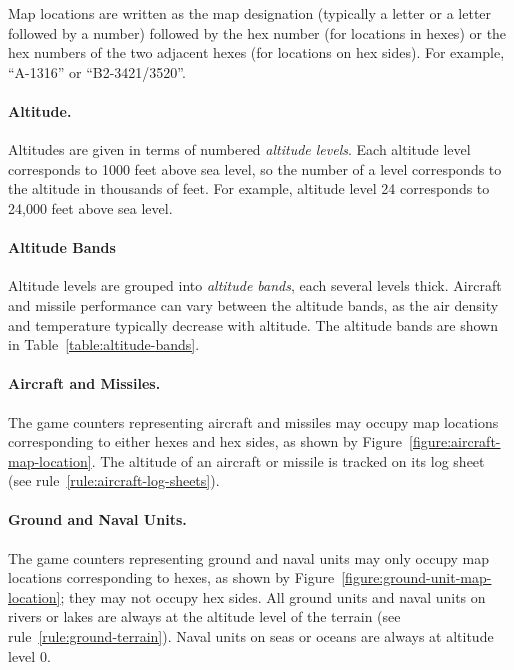 {Map locations are written as the map designation (typically a letter or a letter followed by a number) followed by the hex number (for locations in hexes) or the hex numbers of the two adjacent hexes (for locations on hex sides). For example, “A-1316” or “B2-3421/3520”.

\paragraph{Altitude.}
\label{rule:altitude}

Altitudes are given in terms of numbered \emph{altitude levels}. Each altitude level corresponds to 1000 feet above sea level, so the number of a level corresponds to the altitude in thousands of feet. For example, altitude level 24 corresponds to 24,000 feet above sea level.

\paragraph{Altitude Bands}
\label{rule:altitude-bands}



Altitude levels are grouped into \emph{altitude bands}, each several levels thick. Aircraft and missile performance can vary between the altitude bands, as the air density and temperature typically decrease with altitude. The altitude bands are shown in  Table~\ref{table:altitude-bands}.

\paragraph{Aircraft and Missiles.} 

The game counters representing aircraft and missiles may occupy map locations corresponding to either hexes and hex sides, as shown by Figure~\ref{figure:aircraft-map-location}. The altitude of an aircraft or missile is tracked on its log sheet (see rule~\ref{rule:aircraft-log-sheets}).

\paragraph{Ground and Naval Units.}

The game counters representing ground and naval units may only occupy map locations corresponding to hexes, as shown by Figure~\ref{figure:ground-unit-map-location}; they may not occupy hex sides. All ground units and naval units on rivers or lakes are always at the altitude level of the terrain (see rule~\ref{rule:ground-terrain}). Naval units on seas or oceans are always at altitude level 0.



}

